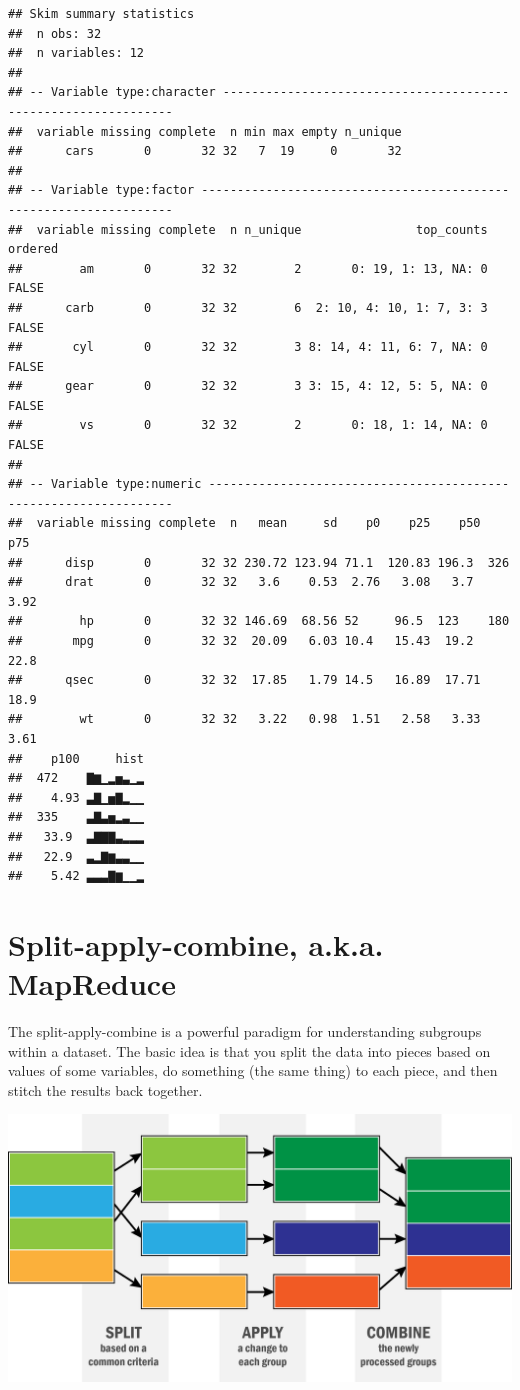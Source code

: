 \documentclass[12pt,letterpaperpaper,openany]{book}
\begin{document}
\begin{verbatim}
## Skim summary statistics
##  n obs: 32 
##  n variables: 12 
## 
## -- Variable type:character ---------------------------------------------------------------
##  variable missing complete  n min max empty n_unique
##      cars       0       32 32   7  19     0       32
## 
## -- Variable type:factor ------------------------------------------------------------------
##  variable missing complete  n n_unique                top_counts ordered
##        am       0       32 32        2       0: 19, 1: 13, NA: 0   FALSE
##      carb       0       32 32        6  2: 10, 4: 10, 1: 7, 3: 3   FALSE
##       cyl       0       32 32        3 8: 14, 4: 11, 6: 7, NA: 0   FALSE
##      gear       0       32 32        3 3: 15, 4: 12, 5: 5, NA: 0   FALSE
##        vs       0       32 32        2       0: 18, 1: 14, NA: 0   FALSE
## 
## -- Variable type:numeric -----------------------------------------------------------------
##  variable missing complete  n   mean     sd    p0    p25    p50    p75
##      disp       0       32 32 230.72 123.94 71.1  120.83 196.3  326   
##      drat       0       32 32   3.6    0.53  2.76   3.08   3.7    3.92
##        hp       0       32 32 146.69  68.56 52     96.5  123    180   
##       mpg       0       32 32  20.09   6.03 10.4   15.43  19.2   22.8 
##      qsec       0       32 32  17.85   1.79 14.5   16.89  17.71  18.9 
##        wt       0       32 32   3.22   0.98  1.51   2.58   3.33   3.61
##    p100     hist
##  472    ▇▆▁▂▅▃▁▂
##    4.93 ▃▇▁▅▇▂▁▁
##  335    ▃▇▃▅▂▃▁▁
##   33.9  ▃▇▇▇▃▂▂▂
##   22.9  ▃▂▇▆▃▃▁▁
##    5.42 ▃▃▃▇▆▁▁▂
\end{verbatim}

\hypertarget{split-apply-combine-a.k.a.-mapreduce}{%
\section{Split-apply-combine, a.k.a. MapReduce}\label{split-apply-combine-a.k.a.-mapreduce}}

The split-apply-combine is a powerful paradigm for understanding subgroups within a dataset. The basic
idea is that you split the data into pieces based on values of some variables, do something (the same thing) to
each piece, and then stitch the results back together.

\includegraphics{img/split-apply-combine.png}
\end{document}
